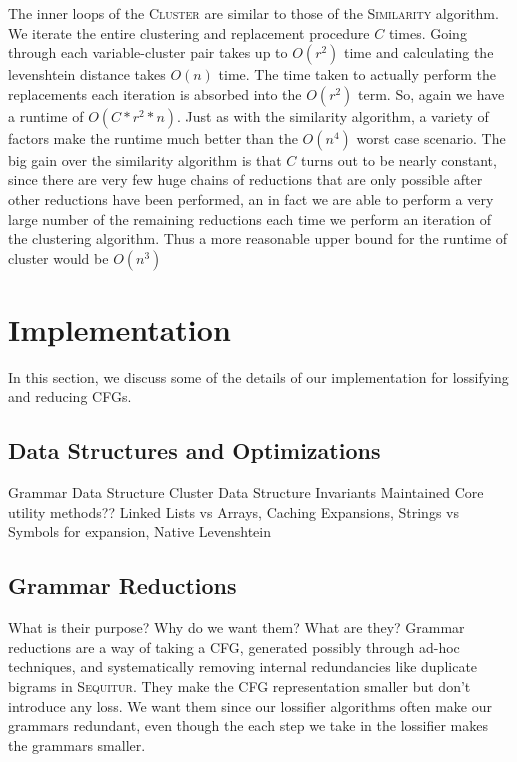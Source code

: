 \documentclass[11pt]{article}
\newcommand{\Sequitur}{\textsc{Sequitur}\xspace}
\newcommand{\Similarity}{\textsc{Similarity}\xspace}
\newcommand{\Cluster}{\textsc{Cluster}\xspace}
\begin{document}
The inner loops of the \Cluster are similar to those of the \Similarity
algorithm.  We iterate the entire clustering and replacement procedure $C$
times. Going through each variable-cluster pair takes up to $O(r^2)$ time and
calculating the levenshtein distance takes $O(n)$ time. The time taken to
actually perform the replacements each iteration is absorbed into the $O(r^2)$
term. So, again we have a runtime of $\boxed{O(C*r^2*n)}$. Just as with the
similarity algorithm, a variety of factors make the runtime much better than
the $\boxed{O(n^4)}$ worst case scenario.  The big gain over the similarity
algorithm is that $C$ turns out to be nearly constant, since there are very few
huge chains of reductions that are only possible after other reductions have
been performed, an in fact we are able to perform a very large number of the
remaining reductions each time we perform an iteration of the clustering
algorithm. Thus a more reasonable upper bound for the runtime of cluster would
be $\boxed{O(n^3)}$

\section{Implementation}

In this section, we discuss some of the details of our implementation for
lossifying and reducing CFGs.

\subsection{Data Structures and Optimizations}

Grammar Data Structure
Cluster Data Structure
Invariants Maintained
Core utility methods??
Linked Lists vs Arrays, Caching Expansions, Strings vs Symbols for expansion, Native Levenshtein

\subsection{Grammar Reductions}

What is their purpose? Why do we want them? What are they?  Grammar reductions
are a way of taking a CFG, generated possibly through ad-hoc techniques, and
systematically removing internal redundancies like duplicate bigrams in
\Sequitur. They make the CFG representation smaller but don't introduce any
loss. We want them since our lossifier algorithms often make our grammars
redundant, even though the each step we take in the lossifier makes the
grammars smaller.
\end{document}
